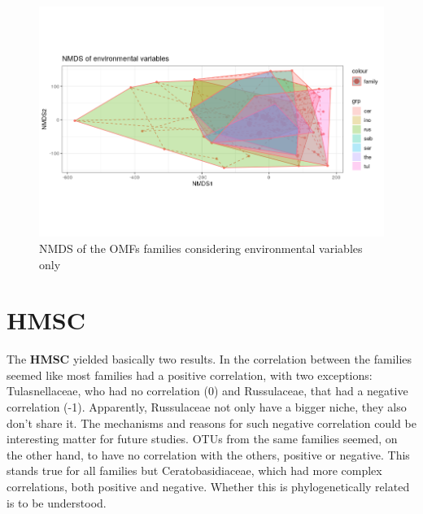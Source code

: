 \begin{figure}[htbp]
\centering
\includegraphics[keepaspectratio,width=\textwidth,height=0.75\textheight]{images/nmdsEnvMatrix.png}
\caption{NMDS of the OMFs families considering environmental variables only}
\end{figure}

\chapter{HMSC}
\label{hmsc}

The \textbf{HMSC} yielded basically two results.
In the correlation between the families seemed like most families had a positive correlation, with two exceptions: Tulasnellaceae, who had no correlation (0) and Russulaceae, that had a negative correlation (-1). Apparently, Russulaceae not only have a bigger niche, they also don't share it. The mechanisms and reasons for such negative correlation could be interesting matter for future studies.
OTUs from the same families seemed, on the other hand, to have no correlation with the others, positive or negative. This stands true for all families but Ceratobasidiaceae, which had more complex correlations, both positive and negative. Whether this is phylogenetically related is to be understood.

